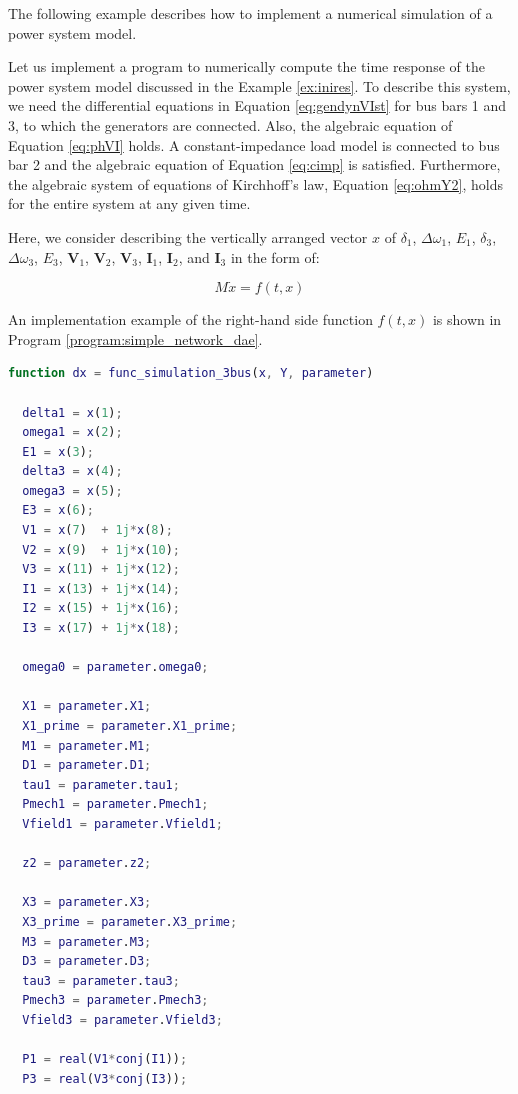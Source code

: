 \documentclass[graybox, envcountchap]{svmult}
\begin{document}
The following example describes how to implement a numerical simulation of a
power system model.

\begin{example}\label{ex:dae_ex2}

Let us implement a program to numerically compute the time response of the power
system model discussed in the Example \ref{ex:inires}. To describe this system,
we need the differential equations in Equation \ref{eq:gendynVIst} for bus bars
1 and 3, to which the generators are connected. Also, the algebraic equation of
Equation \ref{eq:phVI} holds. A constant-impedance load model is connected to
bus bar 2 and the algebraic equation of Equation \ref{eq:cimp} is satisfied.
Furthermore, the algebraic system of equations of Kirchhoff's law, Equation
\ref{eq:ohmY2}, holds for the entire system at any given time.

Here, we consider describing the vertically arranged vector $x$ of $\delta_1$,
$\Delta\omega_1$, $E_1$, $\delta_3$, $\Delta\omega_3$, $E_3$, $\bm V_1$, $\bm
V_2$, $\bm V_3$, $\bm I_1$, $\bm I_2$, and $\bm I_3$ in the form of:

\[
  M\dot{x} = f(t, x)
\]

An implementation example of the right-hand side function $f(t, x)$ is shown in
Program \ref{program:simple_network_dae}.

\begin{lstlisting}[language=Matlab, caption=func\_simulation\_3bus.m, label={program:simple_network_dae}]
function dx = func_simulation_3bus(x, Y, parameter)

  delta1 = x(1);
  omega1 = x(2);
  E1 = x(3);
  delta3 = x(4);
  omega3 = x(5);
  E3 = x(6);
  V1 = x(7)  + 1j*x(8);
  V2 = x(9)  + 1j*x(10);
  V3 = x(11) + 1j*x(12);
  I1 = x(13) + 1j*x(14);
  I2 = x(15) + 1j*x(16);
  I3 = x(17) + 1j*x(18);

  omega0 = parameter.omega0;

  X1 = parameter.X1;
  X1_prime = parameter.X1_prime;
  M1 = parameter.M1;
  D1 = parameter.D1;
  tau1 = parameter.tau1;
  Pmech1 = parameter.Pmech1;
  Vfield1 = parameter.Vfield1;

  z2 = parameter.z2;

  X3 = parameter.X3;
  X3_prime = parameter.X3_prime;
  M3 = parameter.M3;
  D3 = parameter.D3;
  tau3 = parameter.tau3;
  Pmech3 = parameter.Pmech3;
  Vfield3 = parameter.Vfield3;

  P1 = real(V1*conj(I1));
  P3 = real(V3*conj(I3));


\end{lstlisting}
\end{example}
\end{document}
